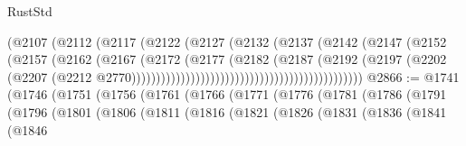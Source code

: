 \begin{lexlean}{RustStd}
\begin{coremodule}
                                                      (@2107
                                                        (@2112
                                                          (@2117
                                                            (@2122
                                                              (@2127
                                                                (@2132
                                                                  (@2137
                                                                    (@2142
                                                                      (@2147
                                                                        (@2152
                                                                          (@2157
                                                                            (@2162
                                                                              (@2167
                                                                                (@2172
                                                                                  (@2177
                                                                                    (@2182
                                                                                      (@2187
                                                                                        (@2192
                                                                                          (@2197
                                                                                            (@2202
                                                                                              (@2207
                                                                                                (@2212
                                                                                                  @2770)))))))))))))))))))))))))))))))))))))))))))))))
@2866 := @1741
    (@1746
      (@1751
        (@1756
          (@1761
            (@1766
              (@1771
                (@1776
                  (@1781
                    (@1786
                      (@1791
                        (@1796
                          (@1801
                            (@1806
                              (@1811
                                (@1816
                                  (@1821
                                    (@1826
                                      (@1831
                                        (@1836
                                          (@1841
                                            (@1846

\end{coremodule}
\end{lexlean}
